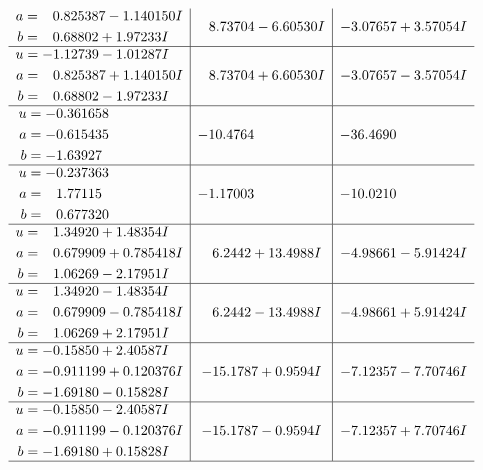 \documentclass[1p]{elsarticle_modified}
\theoremstyle{definition}
\begin{document}
$$\begin{array}{c|c|c}
\begin{aligned}
a &= \phantom{-}0.825387 - 1.140150 I \\
b &= \phantom{-}0.68802 + 1.97233 I\end{aligned}
 & \phantom{-}8.73704 - 6.60530 I & -3.07657 + 3.57054 I \\ \hline\begin{aligned}
u &= -1.12739 - 1.01287 I \\
a &= \phantom{-}0.825387 + 1.140150 I \\
b &= \phantom{-}0.68802 - 1.97233 I\end{aligned}
 & \phantom{-}8.73704 + 6.60530 I & -3.07657 - 3.57054 I \\ \hline\begin{aligned}
u &= -0.361658\phantom{ +0.000000I} \\
a &= -0.615435\phantom{ +0.000000I} \\
b &= -1.63927\phantom{ +0.000000I}\end{aligned}
 & -10.4764\phantom{ +0.000000I} & -36.4690\phantom{ +0.000000I} \\ \hline\begin{aligned}
u &= -0.237363\phantom{ +0.000000I} \\
a &= \phantom{-}1.77115\phantom{ +0.000000I} \\
b &= \phantom{-}0.677320\phantom{ +0.000000I}\end{aligned}
 & -1.17003\phantom{ +0.000000I} & -10.0210\phantom{ +0.000000I} \\ \hline\begin{aligned}
u &= \phantom{-}1.34920 + 1.48354 I \\
a &= \phantom{-}0.679909 + 0.785418 I \\
b &= \phantom{-}1.06269 - 2.17951 I\end{aligned}
 & \phantom{-}6.2442 + 13.4988 I & -4.98661 - 5.91424 I \\ \hline\begin{aligned}
u &= \phantom{-}1.34920 - 1.48354 I \\
a &= \phantom{-}0.679909 - 0.785418 I \\
b &= \phantom{-}1.06269 + 2.17951 I\end{aligned}
 & \phantom{-}6.2442 - 13.4988 I & -4.98661 + 5.91424 I \\ \hline\begin{aligned}
u &= -0.15850 + 2.40587 I \\
a &= -0.911199 + 0.120376 I \\
b &= -1.69180 - 0.15828 I\end{aligned}
 & -15.1787 + 0.9594 I & -7.12357 - 7.70746 I \\ \hline\begin{aligned}
u &= -0.15850 - 2.40587 I \\
a &= -0.911199 - 0.120376 I \\
b &= -1.69180 + 0.15828 I\end{aligned}
 & -15.1787 - 0.9594 I & -7.12357 + 7.70746 I\\
 \hline 
 \end{array}$$\newpage\newpage\renewcommand{\arraystretch}{1}
\end{document}
